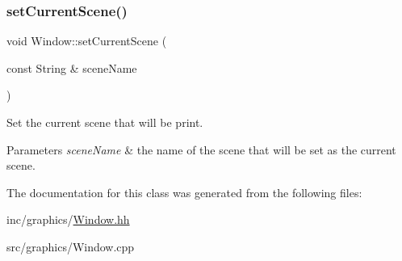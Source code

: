 \subsubsection{\texorpdfstring{set\+Current\+Scene()}{setCurrentScene()}}
{\footnotesize\ttfamily void Window\+::set\+Current\+Scene (\begin{DoxyParamCaption}\item[{const String \&}]{scene\+Name }\end{DoxyParamCaption})}



Set the current scene that will be print. 


\begin{DoxyParams}{Parameters}
{\em \textquotesingle{}scene\+Name\textquotesingle{}} & the name of the scene that will be set as the current scene. \\
\hline
\end{DoxyParams}


The documentation for this class was generated from the following files\+:\begin{DoxyCompactItemize}
\item 
inc/graphics/\hyperlink{Window_8hh}{Window.\+hh}\item 
src/graphics/Window.\+cpp\end{DoxyCompactItemize}
